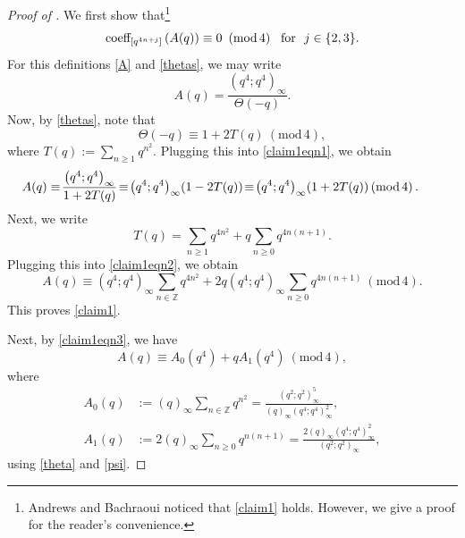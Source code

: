 \documentclass[12pt,reqno]{amsart}
\renewcommand{\(}{\left\(}
\renewcommand{\)}{\right\)}
\newcommand{\os}[2]{\overset{#1}{#2}}
\numberwithin{equation}{section}
\theoremstyle{plain}
\theoremstyle{definition}
\numberwithin{equation}{section}
\renewcommand{\pmod}[1]{\ \left( \mathrm{mod} \, #1 \right)}
\begin{document}
\begin{proof}[Proof of ]
We first show that\footnote{Andrews and Bachraoui \cite[Remark 3]{AB} noticed that \eqref{claim1} holds. However, we give a proof for the reader's convenience.} 
 \begin{equation}\label{claim1}
\textnormal{coeff}_{\left[q^{4n+j}\right]}\left(A(q)\right)\equiv 0\pmod{4}\ \ \text{for}\ \ j\in\{2,3\}.
 \end{equation}
For this definitions \eqref{A} and \eqref{thetas}, we may write 
\begin{equation}\label{claim1eqn1}
A(q)%
=\frac{\left(q^4;q^4\right)_{\infty}}{\Theta(-q)}.
\end{equation}
Now, by \eqref{thetas}, note that 
\[
\Theta(-q)\equiv 1+2T(q)\pmod{4},
\]
where $T(q):=\sum_{n\ge 1} q^{n^2}$. Plugging this into \eqref{claim1eqn1}, we obtain 
\begin{align}\label{claim1eqn2}
\hspace{-0.33 cm}A(q)&\equiv\!\frac{\left(q^4;q^4\right)_{\infty}}{1+2T(q)}\!\equiv\! \left(q^4;q^4\right)_{\infty}\!\left(1-2T(q)\right)\!\equiv\! \left(q^4;q^4\right)_{\infty}\!\left(1+2T(q)\right)\!\!\pmod{4}.
\end{align}
Next, we write %
\[
T(q)=%
\sum_{n\ge 1}q^{4n^2}+q\sum_{n\ge 0}q^{4n(n+1)}.
\]
Plugging this into \eqref{claim1eqn2}, we obtain
\begin{equation}\label{claim1eqn3}
A(q)\equiv \left(q^4;q^4\right)_{\infty}\sum_{n\in \mathbb{Z}}q^{4n^2}+2q\left(q^4;q^4\right)_{\infty}\sum_{n\ge 0}q^{4n(n+1)}\pmod{4}.
\end{equation}
This proves \eqref{claim1}. 

Next, by \eqref{claim1eqn3}, we have 
\begin{equation*}%
A(q)\equiv A_0\!\left(q^4\right)+qA_1\!\left(q^4\right)\pmod{4},
\end{equation*}
where 
\begin{align}\label{claim2eqn1}
A_0(q)&:=\left(q\right)_{\infty}\sum_{n\in \mathbb{Z}}q^{n^2}=\frac{\left(q^2;q^2\right)^5_{\infty}}{\left(q\right)_{\infty}\left(q^{4};q^{4}\right)^2_{\infty}},\nonumber\\
A_1(q)&:=2\left(q\right)_{\infty}\sum_{n\ge 0}q^{n(n+1)}=\frac{2\left(q\right)_{\infty}\left(q^{4};q^{4}\right)^2_{\infty}}{\left(q^2;q^2\right)_{\infty}},
\end{align}
using \eqref{theta} and \eqref{psi}. 


\end{proof}
\end{document}
